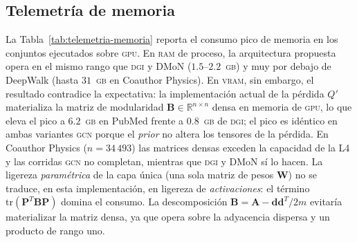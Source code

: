 \documentclass[twoside,twocolumn,10pt]{article}
\begin{document}
\subsection{Telemetría de memoria}
\label{subsec:analisis-telemetria}

\begin{table}[t]
\centering
\caption{Memoria pico por método en los conjuntos ejecutados sobre \textsc{gpu} (NVIDIA L4): \textsc{ram} de proceso y \textsc{vram}, en \textsc{mb}, promediadas sobre cinco semillas.}
\label{tab:telemetria-memoria}
\renewcommand{\arraystretch}{1.1}
\end{table}

La Tabla~\ref{tab:telemetria-memoria} reporta el consumo pico de memoria en los conjuntos ejecutados sobre \textsc{gpu}. En \textsc{ram} de proceso, la arquitectura propuesta opera en el mismo rango que \textsc{dgi} y DMoN ($1.5$--$2.2$~\textsc{gb}) y muy por debajo de DeepWalk (hasta $31$~\textsc{gb} en Coauthor Physics). En \textsc{vram}, sin embargo, el resultado contradice la expectativa: la implementación actual de la pérdida $Q'$ materializa la matriz de modularidad $\mathbf{B} \in \mathbb{R}^{n \times n}$ densa en memoria de \textsc{gpu}, lo que eleva el pico a $6.2$~\textsc{gb} en PubMed frente a $0.8$~\textsc{gb} de \textsc{dgi}; el pico es idéntico en ambas variantes \textsc{gcn} porque el \textit{prior} no altera los tensores de la pérdida. En Coauthor Physics ($n = 34\,493$) las matrices densas exceden la capacidad de la L4 y las corridas \textsc{gcn} no completan, mientras que \textsc{dgi} y DMoN sí lo hacen. La ligereza \emph{paramétrica} de la capa única (una sola matriz de pesos $\mathbf{W}$) no se traduce, en esta implementación, en ligereza de \emph{activaciones}: el término $\mathrm{tr}(\mathbf{P}^T \mathbf{B} \mathbf{P})$ domina el consumo. La descomposición $\mathbf{B} = \mathbf{A} - \mathbf{d}\mathbf{d}^T/2m$ evitaría materializar la matriz densa, ya que opera sobre la adyacencia dispersa y un producto de rango uno.
\end{document}
